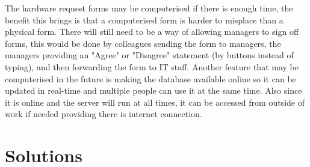 The hardware request forms may be computerised if there is enough time, the benefit this brings is that a computerised form is harder to misplace than a physical form. There will still need to be a way of allowing managers to sign off forms, this would be done by colleagues sending the form to managers, the managers providing an "Agree" or "Disagree" statement (by buttons instead of typing), and then forwarding the form to IT staff. Another feature that may be computerised in the future is making the database available online so it can be updated in real-time and multiple people can use it at the same time. Also since it is online and the server will run at all times, it can be accessed from outside of work if needed providing there is internet connection.

\newpage
\section{Solutions}

